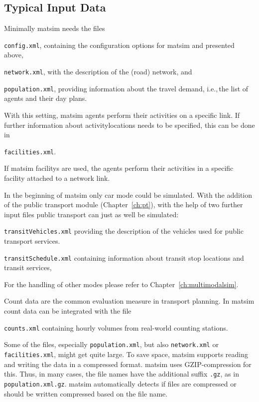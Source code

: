 \subsection{Typical Input Data}
\label{sec:inputdata}
Minimally \gls{matsim} needs the files
\begin{compactitem}
	\item \lstinline|config.xml|, containing the configuration options for \gls{matsim} and presented above,
	\item \lstinline|network.xml|, with the description of the (road) network, and
	\item \lstinline|population.xml|, providing information about	the travel demand, i.e.,\,the list of agents and their day plans.
\end{compactitem}
%
With this setting, \gls{matsim} agents perform their activities on a specific \gls{link}. If further information about \glspl{activitylocation} needs to be specified, this can be done in 
\begin{compactitem}
\item \lstinline|facilities.xml|. 
\end{compactitem}
%
If \gls{matsim} \glspl{facility} are used, the agents perform their activities in a specific \gls{facility} attached to a network link.

In the beginning of \gls{matsim} only car mode could be simulated. With the addition of the public transport \gls{module} (Chapter~\ref{ch:pt}), with the help of two further input files public transport can just as well be simulated:
\begin{compactitem}
\item \lstinline|transitVehicles.xml| providing the description of the vehicles used for public transport services. 
\item \lstinline|transitSchedule.xml| containing information about transit stop locations and transit services,
\end{compactitem}
%
For the handling of other modes please refer to Chapter~\ref{ch:multimodalsim}.

Count data are the common evaluation measure in transport planning. In \gls{matsim} count data can be integrated with the file
\begin{compactitem}
\item \lstinline|counts.xml| containing hourly volumes from real-world counting stations.
\end{compactitem}

Some of the files, especially \lstinline|population.xml|, but also \lstinline|network.xml| or \lstinline|facilities.xml|, might get quite large. To save space, \gls{matsim} supports reading and writing the data in a compressed format. \gls{matsim} uses GZIP-compression for this. Thus, in many cases, the file names have the additional suffix \lstinline|.gz|, as in \lstinline|population.xml.gz|. \gls{matsim} automatically detects if files are compressed or should be written compressed based on the file name. 

